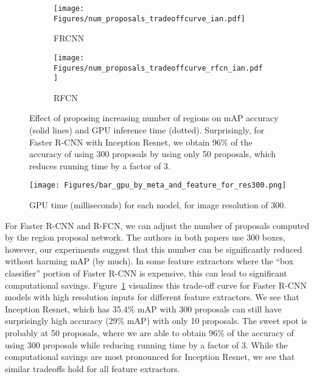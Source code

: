 \documentclass[10pt,twocolumn,letterpaper]{article}
\begin{document}
\begin{figure*}
\begin{center}
\begin{subfigure}[t]{0.35\textwidth}
  \texttt{[image: Figures/num\_proposals\_tradeoffcurve\_ian.pdf]}
  \caption{FRCNN}
\label{fig:faster_rcnn_proposals_tradeoff}
\end{subfigure}\qquad
\begin{subfigure}[t]{0.35\linewidth}
  \texttt{[image: Figures/num\_proposals\_tradeoffcurve\_rfcn\_ian.pdf]}
  \caption{RFCN}
\label{fig:rfcn_proposals_tradeoff}
\end{subfigure}
\end{center}
\caption{
\footnotesize  
Effect of proposing increasing number of regions
on mAP accuracy (solid lines) and
GPU inference time (dotted).
Surprisingly, for Faster R-CNN with Inception
Resnet, we obtain 96\% of the accuracy of using 300 proposals by using
only 50 proposals, which reduces running time by a factor of 3. 
}
\end{figure*}

\begin{figure*}[t!]
\begin{center}
\texttt{[image: Figures/bar\_gpu\_by\_meta\_and\_feature\_for\_res300.png]}\vspace{-4mm}
\caption{
\footnotesize GPU time (milliseconds) for each model,
for image resolution of 300.
}\vspace{-4mm}
\label{fig:bar_gpu_time}
\end{center}
\end{figure*}

For Faster R-CNN and R-FCN, we can adjust the number of proposals
computed by the region proposal network.  The authors in both papers
use 300 boxes, however, our experiments suggest that this number can
be significantly reduced without harming mAP (by much).  In some
feature extractors where the ``box classifier'' portion of Faster
R-CNN is expensive, this can lead to significant computational
savings.  Figure~\ref{fig:faster_rcnn_proposals_tradeoff} visualizes
this trade-off curve for Faster R-CNN models with high resolution
inputs for different feature extractors.   
We see that Inception Resnet, which has 35.4\% mAP with 300 proposals
can still have surprisingly high accuracy (29\% mAP) with only 10
proposals.  The sweet spot is probably at 50 proposals, where we are
able to obtain 96\% of the accuracy of using 300 proposals while
reducing running time by a factor of 3.  While the computational
savings are most pronounced for Inception Resnet, we see that similar
tradeoffs hold for all feature extractors. 
\end{document}
